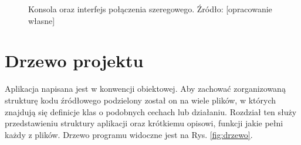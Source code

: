 \begin{figure}[h]
	
	\centering
	\setlength{\fboxsep}{0pt}
	\setlength{\fboxrule}{1pt}
	\caption{Konsola oraz interfejs połączenia szeregowego. Źródło: [opracowanie własne]} 
	\label{fig:konsola_gui}
	
\end{figure}

\section{Drzewo projektu}

Aplikacja napisana jest w konwencji obiektowej. Aby zachować zorganizowaną strukturę kodu źródłowego podzielony został on na wiele plików, w których znajdują się definicje klas o podobnych cechach lub działaniu. Rozdział ten służy przedstawieniu struktury aplikacji oraz krótkiemu opisowi, funkcji jakie pełni każdy z plików. Drzewo programu widoczne jest na Rys. \ref{fig:drzewo}. 

